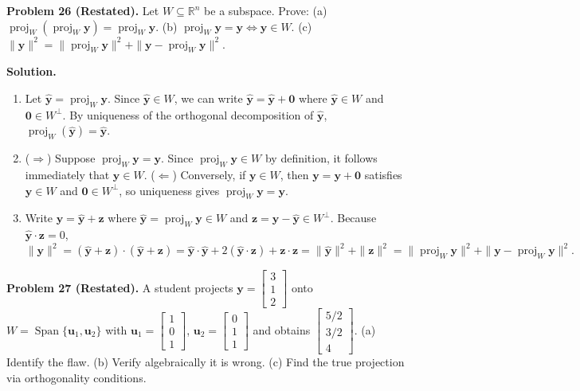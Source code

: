 \documentclass[11pt, letterpaper]{article}
\theoremstyle{definition}
\theoremstyle{remark}
\newcommand{\R}{\mathbb{R}}
\begin{document}
\medskip
\textbf{Problem 26 (Restated).} Let $W \subseteq \R^n$ be a subspace. Prove: (a) $\operatorname{proj}_W(\operatorname{proj}_W \mathbf{y}) = \operatorname{proj}_W \mathbf{y}$. (b) $\operatorname{proj}_W \mathbf{y} = \mathbf{y} \iff \mathbf{y} \in W$. (c) $\|\mathbf{y}\|^2 = \|\operatorname{proj}_W \mathbf{y}\|^2 + \|\mathbf{y} - \operatorname{proj}_W \mathbf{y}\|^2$.

\textbf{Solution.}
\begin{enumerate}[label=(\alph*)]
    \item Let $\hat{\mathbf{y}} = \operatorname{proj}_W \mathbf{y}$. Since $\hat{\mathbf{y}} \in W$, we can write $\hat{\mathbf{y}} = \hat{\mathbf{y}} + \mathbf{0}$ where $\hat{\mathbf{y}} \in W$ and $\mathbf{0} \in W^\perp$. By uniqueness of the orthogonal decomposition of $\hat{\mathbf{y}}$, $\operatorname{proj}_W(\hat{\mathbf{y}}) = \hat{\mathbf{y}}$.
    \item ($\Rightarrow$) Suppose $\operatorname{proj}_W \mathbf{y} = \mathbf{y}$. Since $\operatorname{proj}_W \mathbf{y} \in W$ by definition, it follows immediately that $\mathbf{y} \in W$. ($\Leftarrow$) Conversely, if $\mathbf{y} \in W$, then $\mathbf{y} = \mathbf{y} + \mathbf{0}$ satisfies $\mathbf{y} \in W$ and $\mathbf{0} \in W^\perp$, so uniqueness gives $\operatorname{proj}_W \mathbf{y} = \mathbf{y}$.
    \item Write $\mathbf{y} = \hat{\mathbf{y}} + \mathbf{z}$ where $\hat{\mathbf{y}} = \operatorname{proj}_W \mathbf{y} \in W$ and $\mathbf{z} = \mathbf{y} - \hat{\mathbf{y}} \in W^\perp$. Because $\hat{\mathbf{y}} \cdot \mathbf{z} = 0$,
    \[
    \|\mathbf{y}\|^2 = (\hat{\mathbf{y}} + \mathbf{z}) \cdot (\hat{\mathbf{y}} + \mathbf{z}) = \hat{\mathbf{y}}\cdot\hat{\mathbf{y}} + 2(\hat{\mathbf{y}}\cdot\mathbf{z}) + \mathbf{z}\cdot\mathbf{z} = \|\hat{\mathbf{y}}\|^2 + \|\mathbf{z}\|^2 = \|\operatorname{proj}_W \mathbf{y}\|^2 + \|\mathbf{y} - \operatorname{proj}_W \mathbf{y}\|^2.
    \]
\end{enumerate}

\medskip
\textbf{Problem 27 (Restated).} A student projects $\mathbf{y} = \begin{bmatrix} 3 \\ 1 \\ 2 \end{bmatrix}$ onto $W = \operatorname{Span}\{\mathbf{u}_1, \mathbf{u}_2\}$ with $\mathbf{u}_1 = \begin{bmatrix} 1 \\ 0 \\ 1 \end{bmatrix}$, $\mathbf{u}_2 = \begin{bmatrix} 0 \\ 1 \\ 1 \end{bmatrix}$ and obtains $\begin{bmatrix} 5/2 \\ 3/2 \\ 4 \end{bmatrix}$. (a) Identify the flaw. (b) Verify algebraically it is wrong. (c) Find the true projection via orthogonality conditions.
\end{document}
